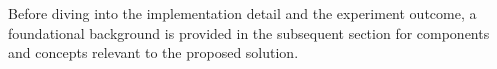 Before diving into the implementation detail and the experiment outcome, a foundational background is provided in the subsequent section for components and concepts relevant to the proposed solution. 















